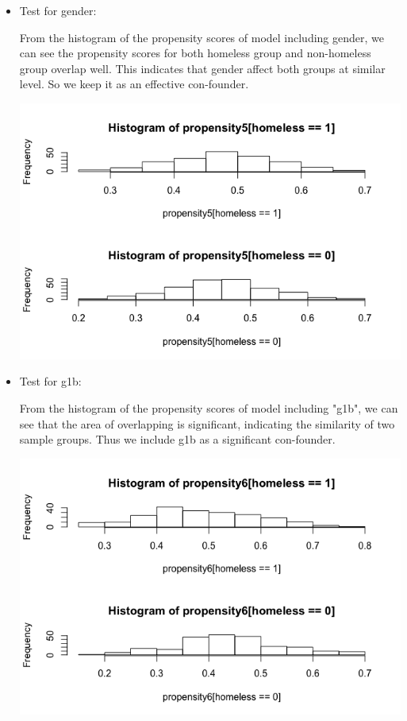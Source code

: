 \documentclass{report}
\begin{document}
\begin{itemize}
\begin{minipage}{0.5\linewidth}
    \end{minipage}
    \item Test for gender:\\
    \begin{minipage}{0.5\linewidth}
         From the histogram of the propensity scores of model including gender, we can see the propensity scores for both homeless group and non-homeless group overlap well. This indicates that gender affect both groups at similar level. So we keep it as an effective con-founder. 
    \end{minipage}
    \begin{minipage}{0.5\linewidth}
        \centering
        \includegraphics[scale=0.25]{5.png}
    \end{minipage}
    \item Test for g1b:\\
    \begin{minipage}{0.5\linewidth}
         From the histogram of the propensity scores of model including "g1b", we can see that the area of overlapping is significant, indicating the similarity of two sample groups. Thus we include g1b as a significant con-founder. 
    \end{minipage}
    \begin{minipage}{0.5\linewidth}
        \centering
        \includegraphics[scale=0.25]{6.png}

\end{minipage}
\end{itemize}
\end{document}
